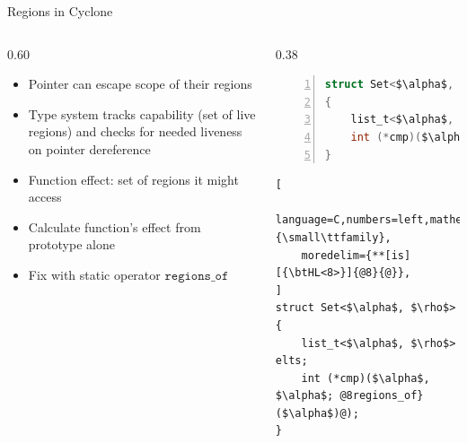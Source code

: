 \documentclass[aspectratio=169]{beamer}
\begin{document}
\begin{frame}[fragile]{Regions in Cyclone}
\footnotesize

  \begin{columns}[T]
    \begin{column}{0.60\textwidth}
      \begin{itemize}[<+->]
        \item Pointer can escape scope of their regions 
        \item Type system tracks \alert{capability} (set of live regions) and checks for needed liveness on pointer dereference %
        \item Function \alert{effect}: set of regions it might access
        \item Calculate function's effect from prototype alone
        \item Fix with static operator $\texttt{regions\_of}$ %
      \end{itemize}
    \end{column}

\begin{column}{0.38\textwidth}

    \pause

\begin{lstlisting}[language=C,numbers=left,mathescape,basicstyle={\footnotesize\ttfamily}]
struct Set<$\alpha$, $\rho$, $\epsilon$>
{
    list_t<$\alpha$, $\rho$> elts;
    int (*cmp)($\alpha$, $\alpha$; $\epsilon$);
}
\end{lstlisting}

\pause

\begin{lstlisting}[
    language=C,numbers=left,mathescape,basicstyle={\small\ttfamily},
    moredelim={**[is][{\btHL<8>}]{@8}{@}},
]
struct Set<$\alpha$, $\rho$>
{
    list_t<$\alpha$, $\rho$> elts;
    int (*cmp)($\alpha$, $\alpha$; @8regions_of}($\alpha$)@);
}
\end{lstlisting}

\end{column}
\end{columns}

\end{frame}
\end{document}
